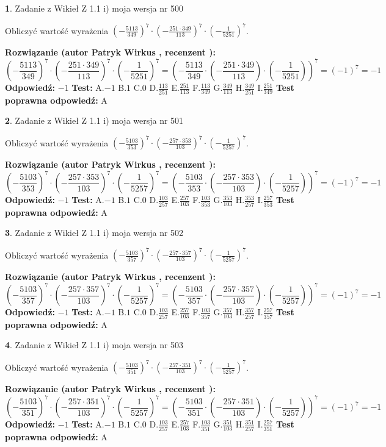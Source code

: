 \documentclass[12pt, a4paper]{article}
\theoremstyle{definition} %
\newtheorem{zad}{}
\newcommand{\zadStart}[1]{\begin{zad}#1\newline}
\newcommand{\zadStop}{\end{zad}}
\newcommand{\rozwStart}[2]{\noindent \textbf{Rozwiązanie (autor #1 , recenzent #2): }\newline}
\newcommand{\rozwStop}{\newline}
\newcommand{\odpStart}{\noindent \textbf{Odpowiedź:}\newline}
\newcommand{\odpStop}{\newline}
\newcommand{\testStart}{\noindent \textbf{Test:}\newline}
\newcommand{\testStop}{\newline}
\newcommand{\kluczStart}{\noindent \textbf{Test poprawna odpowiedź:}\newline}
\newcommand{\kluczStop}{\newline}
\begin{document}
\zadStart{Zadanie z Wikieł Z 1.1 i) moja wersja nr 500}

Obliczyć wartość wyrażenia $(-\frac{5113}{349})^{7} \cdot (-\frac{251 \cdot 349}{113})^{7} \cdot (-\frac{1}{5251})^{7}$.
\zadStop
\rozwStart{Patryk Wirkus}{}
$$(-\frac{5113}{349})^{7} \cdot (-\frac{251 \cdot 349}{113})^{7} \cdot (-\frac{1}{5251})^{7} = (-\frac{5113}{349} \cdot (-\frac{251 \cdot 349}{113}) \cdot (-\frac{1}{5251}))^{7} = (-1)^{7} = -1$$
\rozwStop
\odpStart
$-1$
\odpStop
\testStart
A.$-1$ B.$1$ C.$0$ D.$\frac{113}{251}$ E.$\frac{251}{113}$
F.$\frac{113}{349}$ G.$\frac{349}{113}$
H.$\frac{349}{251}$
I.$\frac{251}{349}$
\testStop
\kluczStart
A
\kluczStop



\zadStart{Zadanie z Wikieł Z 1.1 i) moja wersja nr 501}

Obliczyć wartość wyrażenia $(-\frac{5103}{353})^{7} \cdot (-\frac{257 \cdot 353}{103})^{7} \cdot (-\frac{1}{5257})^{7}$.
\zadStop
\rozwStart{Patryk Wirkus}{}
$$(-\frac{5103}{353})^{7} \cdot (-\frac{257 \cdot 353}{103})^{7} \cdot (-\frac{1}{5257})^{7} = (-\frac{5103}{353} \cdot (-\frac{257 \cdot 353}{103}) \cdot (-\frac{1}{5257}))^{7} = (-1)^{7} = -1$$
\rozwStop
\odpStart
$-1$
\odpStop
\testStart
A.$-1$ B.$1$ C.$0$ D.$\frac{103}{257}$ E.$\frac{257}{103}$
F.$\frac{103}{353}$ G.$\frac{353}{103}$
H.$\frac{353}{257}$
I.$\frac{257}{353}$
\testStop
\kluczStart
A
\kluczStop



\zadStart{Zadanie z Wikieł Z 1.1 i) moja wersja nr 502}

Obliczyć wartość wyrażenia $(-\frac{5103}{357})^{7} \cdot (-\frac{257 \cdot 357}{103})^{7} \cdot (-\frac{1}{5257})^{7}$.
\zadStop
\rozwStart{Patryk Wirkus}{}
$$(-\frac{5103}{357})^{7} \cdot (-\frac{257 \cdot 357}{103})^{7} \cdot (-\frac{1}{5257})^{7} = (-\frac{5103}{357} \cdot (-\frac{257 \cdot 357}{103}) \cdot (-\frac{1}{5257}))^{7} = (-1)^{7} = -1$$
\rozwStop
\odpStart
$-1$
\odpStop
\testStart
A.$-1$ B.$1$ C.$0$ D.$\frac{103}{257}$ E.$\frac{257}{103}$
F.$\frac{103}{357}$ G.$\frac{357}{103}$
H.$\frac{357}{257}$
I.$\frac{257}{357}$
\testStop
\kluczStart
A
\kluczStop



\zadStart{Zadanie z Wikieł Z 1.1 i) moja wersja nr 503}

Obliczyć wartość wyrażenia $(-\frac{5103}{351})^{7} \cdot (-\frac{257 \cdot 351}{103})^{7} \cdot (-\frac{1}{5257})^{7}$.
\zadStop
\rozwStart{Patryk Wirkus}{}
$$(-\frac{5103}{351})^{7} \cdot (-\frac{257 \cdot 351}{103})^{7} \cdot (-\frac{1}{5257})^{7} = (-\frac{5103}{351} \cdot (-\frac{257 \cdot 351}{103}) \cdot (-\frac{1}{5257}))^{7} = (-1)^{7} = -1$$
\rozwStop
\odpStart
$-1$
\odpStop
\testStart
A.$-1$ B.$1$ C.$0$ D.$\frac{103}{257}$ E.$\frac{257}{103}$
F.$\frac{103}{351}$ G.$\frac{351}{103}$
H.$\frac{351}{257}$
I.$\frac{257}{351}$
\testStop
\kluczStart
A
\kluczStop
\end{document}

